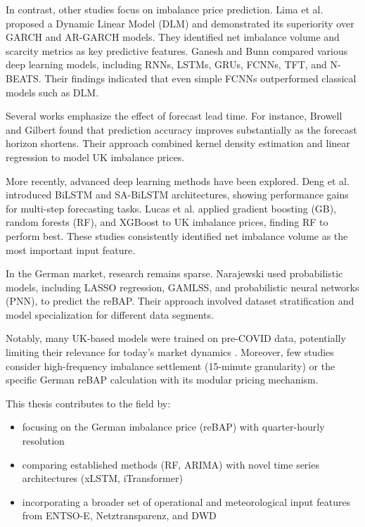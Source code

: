 \documentclass[class=scrbook, crop=false]{standalone}
\begin{document}
In contrast, other studies focus on imbalance price prediction. Lima et al. \cite{limaBayesianPredictiveDistributions2023} proposed a Dynamic Linear Model (DLM) and demonstrated its superiority over GARCH and AR-GARCH models. They identified net imbalance volume and scarcity metrics as key predictive features. Ganesh and Bunn  \cite{ganeshForecastingImbalancePrice2024} compared various deep learning models, including RNNs, LSTMs, GRUs, FCNNs, TFT, and N-BEATS. Their findings indicated that even simple FCNNs outperformed classical models such as DLM.

Several works emphasize the effect of forecast lead time. For instance, Browell and Gilbert \cite{browellPredictingElectricityImbalance2022} found that prediction accuracy improves substantially as the forecast horizon shortens. Their approach combined kernel density estimation and linear regression to model UK imbalance prices.

More recently, advanced deep learning methods have been explored. Deng et al. \cite{dengSeasonalityDeepLearning2024} introduced BiLSTM and SA-BiLSTM architectures, showing performance gains for multi-step forecasting tasks. Lucas et al. \cite{lucasPriceForecastingBalancing2020} applied gradient boosting (GB), random forests (RF), and XGBoost to UK imbalance prices, finding RF to perform best. These studies consistently identified net imbalance volume as the most important input feature.

In the German market, research remains sparse. Narajewski \cite{narajewskiProbabilisticForecastingGerman2022} used probabilistic models, including LASSO regression, GAMLSS, and probabilistic neural networks (PNN), to predict the reBAP. Their approach involved dataset stratification and model specialization for different data segments.

Notably, many UK-based models were trained on pre-COVID data, potentially limiting their relevance for today’s market dynamics  \cite{abadieEnergyMarketPrices2021}. Moreover, few studies consider high-frequency imbalance settlement (15-minute granularity) or the specific German reBAP calculation with its modular pricing mechanism.

This thesis contributes to the field by:
\begin{itemize}
\item focusing on the German imbalance price (reBAP) with quarter-hourly resolution
\item comparing established methods (RF, ARIMA) with novel time series architectures (xLSTM, iTransformer)
\item incorporating a broader set of operational and meteorological input features from ENTSO-E, Netztransparenz, and DWD
\end{itemize}
\end{document}

